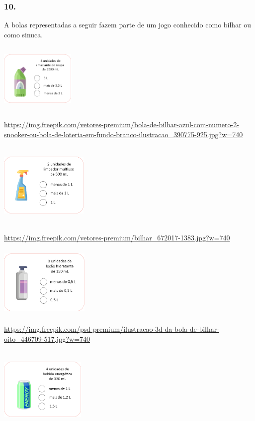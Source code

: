 \begin{enumerate}
\subsubsection{10.}\label{section-9}

A bolas representadas a seguir fazem parte de um jogo conhecido como
bilhar ou como sinuca.

\includegraphics[width=1.40833in,height=1.33406in]{media/image21.png}

\url{https://img.freepik.com/vetores-premium/bola-de-bilhar-azul-com-numero-2-snooker-ou-bola-de-loteria-em-fundo-branco-ilustracao_390775-925.jpg?w=740}

\includegraphics[width=1.66667in,height=1.61877in]{media/image22.png}

\url{https://img.freepik.com/vetores-premium/bilhar_672017-1383.jpg?w=740}

\includegraphics[width=1.68333in,height=1.36449in]{media/image23.png}

\url{https://img.freepik.com/psd-premium/ilustracao-3d-da-bola-de-bilhar-oito_446709-517.jpg?w=740}

\includegraphics[width=1.61667in,height=1.60236in]{media/image24.png}


\end{enumerate}
